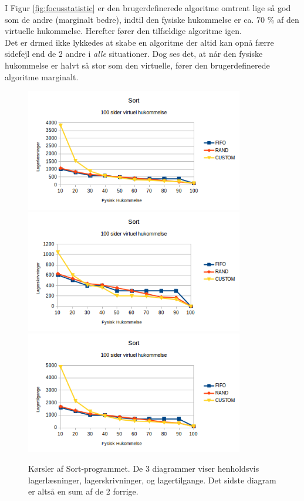 I Figur \ref{fig:focusstatistic} er den brugerdefinerede algoritme omtrent lige så god som de andre (marginalt bedre), indtil den fysiske hukommelse er ca. 70 \% af den virtuelle hukommelse. Herefter fører den tilfældige algoritme igen.\\

Det er drmed ikke lykkedes at skabe en algoritme der altid kan opnå færre sidefejl end de 2 andre i \textit{alle} situationer. Dog ses det, at når den fysiske hukommelse er halvt så stor som den virtuelle, fører den brugerdefinerede algoritme marginalt.\\

\begin{figure}[H]
	\centering
	\includegraphics[width=0.85\textwidth]{figures/SortReads.png}	\includegraphics[width=0.85\textwidth]{figures/SortWrites.png}	\includegraphics[width=0.85\textwidth]{figures/SortAccess.png}
	\caption{Kørsler af Sort-programmet. De 3 diagrammer viser henholdsvis lagerlæsninger, lagerskrivninger, og lagertilgange. Det sidste diagram er altså en sum af de 2 forrige.}
	\label{fig:sortdisk}
\end{figure}

